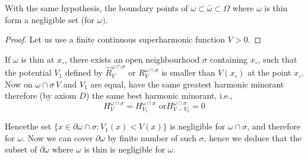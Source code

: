 \begin{thm}\label{p4:chap9:sec40:thm33} %
  With the same hypothesis, the boundary points of $\omega \subset
  \bar{\omega}\subset \Omega$ where $\omega$ is thin form a negligible
  set (for $\omega)$. 
\end{thm}

\begin{proof} %
  Let us use a finite continuous superharmonic function $V > 0$.
\end{proof}

If $\omega$ is thin at $x_\circ$, there exists an open neighbourhood
$\sigma$ containing $x_\circ$, such that the potential $V_1$ defined by
$\hat{R}_V^{\omega \cap \sigma}$ or $R_V^{\omega \cap \sigma}$ is
smaller than $V (x_\circ)$ at the point $x_\circ$. Now on $\omega \cap \sigma\,
V$ and $V_1$ are equal, have the same greatest harmonic minorant
therefore (by axiom $D$) the same best harmonic minorant, i.e., 
$$
H^{\omega \cap \sigma}_V = H^{\omega \cap \sigma}_{V_1} \text {   or
} H^{\omega \cap \sigma}_{V- V_1} = 0 
$$

Hence\pageoriginale the set $\big \{x \in \partial \omega \cap \sigma  : V_1 (x) <
V(x) \big \}$ is negligible for $\omega \cap \sigma$, and therefore
for $\omega$. Now we can cover $\partial \omega$ by finite number of
such $\sigma$, hence we deduce that the subset of $\partial \omega$
where $\omega$ is thin is negligible for $\omega$. 

